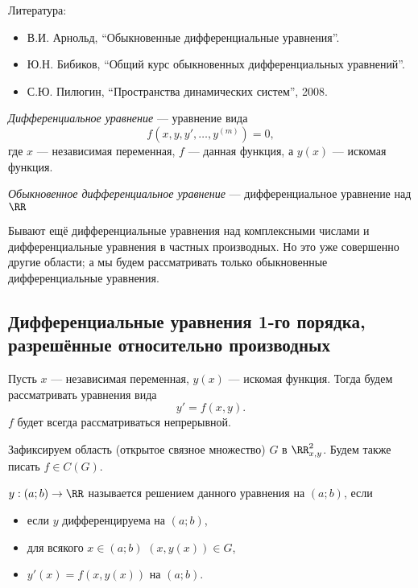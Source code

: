 \documentclass[12pt,a4paper]{article}
\date{}
\begin{document}
    \maketitle

    \listoftodos[TODOs]

    \tableofcontents

    \vspace{2em}
    Литература:
    \begin{itemize}
        \item В.И. Арнольд, ``Обыкновенные дифференциальные уравнения''.
        \item Ю.Н. Бибиков, ``Общий курс обыкновенных дифференциальных уравнений''.
        \item С.Ю. Пилюгин, ``Пространства динамических систем'', 2008.
    \end{itemize}

    \begin{definition}
        \emph{Дифференциальное уравнение} --- уравнение вида
        \[f(x, y, y', \dots, y^{(m)}) = 0,\]
        где $x$ --- независимая переменная, $f$ --- данная функция, а $y(x)$ --- искомая функция.

        \emph{Обыкновенное дифференциальное уравнение} --- дифференциальное уравнение над $\RR$
    \end{definition}

    \begin{remark*}
        Бывают ещё дифференциальные уравнения над комплексными числами и дифференциальные уравнения в частных производных. Но это уже совершенно другие области; а мы будем рассматривать только обыкновенные дифференциальные уравнения.
    \end{remark*}

    \subsection{Дифференциальные уравнения 1-го порядка, разрешённые относительно производных}

    Пусть $x$ --- независимая переменная, $y(x)$ --- искомая функция. Тогда будем рассматривать уравнения вида
    \[y' = f(x, y).\]
    $f$ будет всегда рассматриваться непрерывной.

    Зафиксируем область (открытое связное множество) $G$ в $\RR^2_{x, y}$. Будем также писать $f \in C(G)$.

    \begin{definition}
        $y: (a; b) \to \RR$ называется решением данного уравнения на $(a; b)$, если
        \begin{itemize}
            \item если $y$ дифференцируема на $(a; b)$,
            \item для всякого $x \in (a; b)$ $(x, y(x)) \in G$,
            \item $y'(x) = f(x, y(x))$ на $(a; b)$.
        \end{itemize}
    \end{definition}
\end{document}
